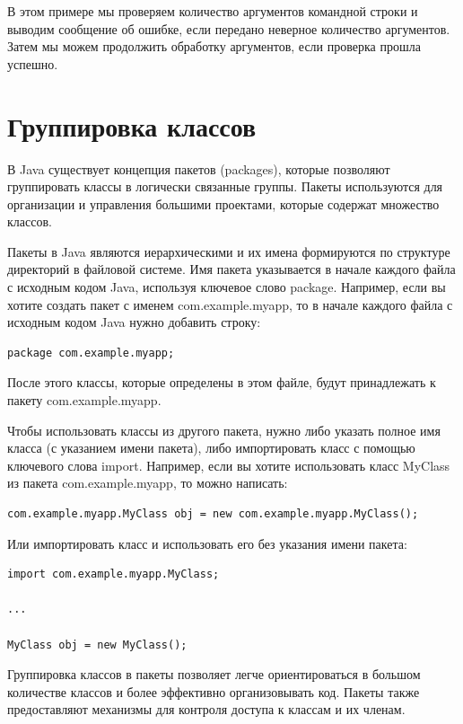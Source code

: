 В этом примере мы проверяем количество аргументов командной строки и выводим сообщение об ошибке, если передано неверное количество аргументов. Затем мы можем продолжить обработку аргументов, если проверка прошла успешно.

\section{Группировка классов}

В Java существует концепция пакетов (packages), которые позволяют группировать классы в логически связанные группы. Пакеты используются для организации и управления большими проектами, которые содержат множество классов.

Пакеты в Java являются иерархическими и их имена формируются по структуре директорий в файловой системе. Имя пакета указывается в начале каждого файла с исходным кодом Java, используя ключевое слово package. Например, если вы хотите создать пакет с именем com.example.myapp, то в начале каждого файла с исходным кодом Java нужно добавить строку:

\begin{lstlisting}
package com.example.myapp;
\end{lstlisting}

После этого классы, которые определены в этом файле, будут принадлежать к пакету com.example.myapp.

Чтобы использовать классы из другого пакета, нужно либо указать полное имя класса (с указанием имени пакета), либо импортировать класс с помощью ключевого слова import. Например, если вы хотите использовать класс MyClass из пакета com.example.myapp, то можно написать:

\begin{lstlisting}
com.example.myapp.MyClass obj = new com.example.myapp.MyClass();
\end{lstlisting}

Или импортировать класс и использовать его без указания имени пакета:

\begin{lstlisting}
import com.example.myapp.MyClass;

...

MyClass obj = new MyClass();
\end{lstlisting}

Группировка классов в пакеты позволяет легче ориентироваться в большом количестве классов и более эффективно организовывать код. Пакеты также предоставляют механизмы для контроля доступа к классам и их членам.

